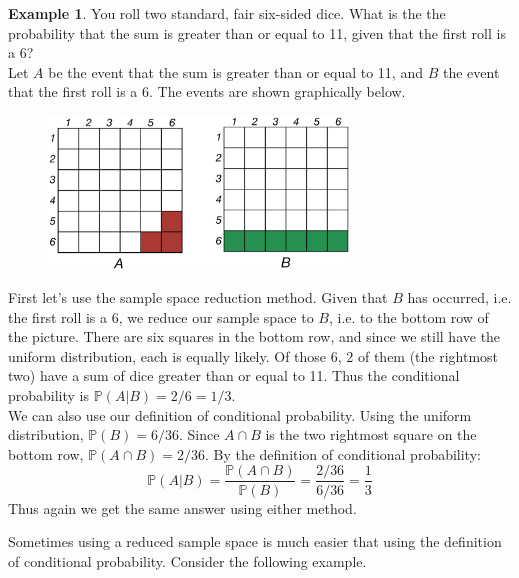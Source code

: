 \documentclass[12pt]{article}
\theoremstyle{definition}
\newtheorem*{example}{Example}
\theoremstyle{remark}
\def\P{{\mathbb P}}
\begin{document}
\begin{example}
You roll two standard, fair six-sided dice. What is the the probability that the sum is greater than or equal to 11, given that the first roll is a 6?\\

Let $A$ be the event that the sum is greater than or equal to 11, and $B$ the event that the first roll is a 6. The events are shown graphically below.
\begin{figure}[H]
\centering
\includegraphics[width=8cm]{2dice1.eps}
\end{figure}
First let's use the sample space reduction method. Given that $B$ has occurred, i.e. the first roll is a 6, we reduce our sample space to $B$, i.e. to the bottom row of the picture. There are six squares in the bottom row, and since we still have the uniform distribution, each is equally likely. Of those 6, 2 of them (the rightmost two) have a sum of dice greater than or equal to 11. Thus the conditional probability is $\P(A|B) = 2/6 = 1/3$.\\

We can also use our definition of conditional probability. Using the uniform distribution, $\P(B) = 6/36$. Since $A \cap B$ is the two rightmost square on the bottom row, $\P(A \cap B) = 2/36$. By the definition of conditional probability:
\[
\P(A|B) = \frac{ \P(A \cap B)}{\P(B)} = \frac{2/36}{6/36} = \frac{1}{3}
\]
Thus again we get the same answer using either method.
\end{example}

Sometimes using a reduced sample space is much easier that using the definition of conditional probability. Consider the following example.
\end{document}

